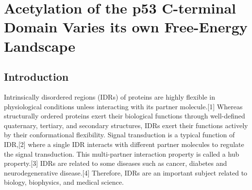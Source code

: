 \chapter{Acetylation of the p53 C-terminal Domain Varies its own Free-Energy Landscape}

\section{Introduction}
Intrinsically disordered regions (IDRs) of proteins are highly flexible in physiological conditions unless interacting with its partner molecule.[1] 
Whereas structurally ordered proteins exert their biological functions through well-defined quaternary, tertiary, and secondary structures, IDRs exert their functions actively by their conformational flexibility. 
Signal transduction is a typical function of IDR,[2] where a single IDR interacts with different partner molecules to regulate the signal transduction. 
This multi-partner interaction property is called a hub property.[3] 
IDRs are related to some diseases such as cancer, diabetes and neurodegenerative disease.[4] 
Therefore, IDRs are an important subject related to biology, biophysics, and medical science.

